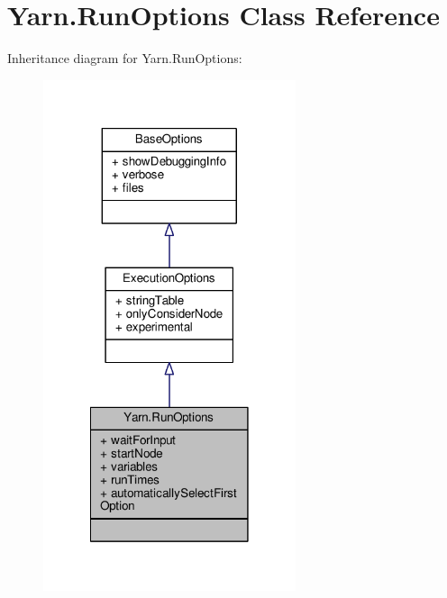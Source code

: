 \hypertarget{a00159}{\section{Yarn.\-Run\-Options Class Reference}
\label{a00159}
}


Inheritance diagram for Yarn.\-Run\-Options\-:
\nopagebreak
\begin{figure}[H]
\begin{center}
\leavevmode
\includegraphics[width=210pt]{a00744}
\end{center}
\end{figure}


